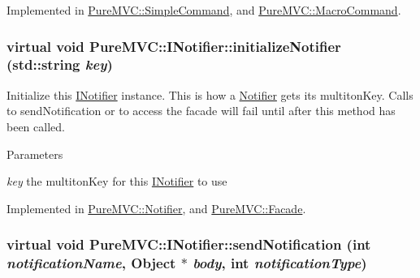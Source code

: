 Implemented in \hyperlink{class_pure_m_v_c_1_1_simple_command_af3f75f1ff33ba4afabec5ee2a8a83d20}{PureMVC::SimpleCommand}, and \hyperlink{class_pure_m_v_c_1_1_macro_command_a23d3bdc5519b108646e1b169e5eaa219}{PureMVC::MacroCommand}.\hypertarget{class_pure_m_v_c_1_1_i_notifier_a28d7dbbe0726d4d52080546c5d79b232}{
\subsubsection[{initializeNotifier}]{\setlength{\rightskip}{0pt plus 5cm}virtual void PureMVC::INotifier::initializeNotifier (std::string {\em key})}}
\label{class_pure_m_v_c_1_1_i_notifier_a28d7dbbe0726d4d52080546c5d79b232}


Initialize this \hyperlink{class_pure_m_v_c_1_1_i_notifier}{INotifier} instance. This is how a \hyperlink{class_pure_m_v_c_1_1_notifier}{Notifier} gets its multitonKey. Calls to sendNotification or to access the facade will fail until after this method has been called.


\begin{DoxyParams}{Parameters}
\item[{\em key}]the multitonKey for this \hyperlink{class_pure_m_v_c_1_1_i_notifier}{INotifier} to use \end{DoxyParams}


Implemented in \hyperlink{class_pure_m_v_c_1_1_notifier_a6910365c70415ba7973401215f57e4af}{PureMVC::Notifier}, and \hyperlink{class_pure_m_v_c_1_1_facade_a94c72ff29f9f42ff084f247b180fb4ad}{PureMVC::Facade}.\hypertarget{class_pure_m_v_c_1_1_i_notifier_a65e8333ccfea74138b79f84dac96af25}{
\subsubsection[{sendNotification}]{\setlength{\rightskip}{0pt plus 5cm}virtual void PureMVC::INotifier::sendNotification (int {\em notificationName}, \/  {\bf Object} $\ast$ {\em body}, \/  int {\em notificationType})}}
\label{class_pure_m_v_c_1_1_i_notifier_a65e8333ccfea74138b79f84dac96af25}


